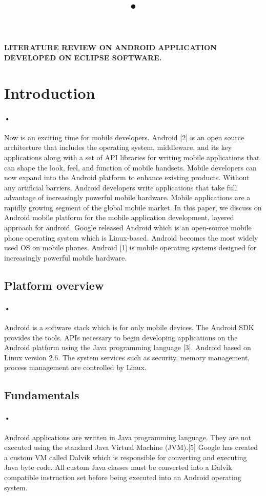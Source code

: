 \documentclass[12pt]{article}
\begin{document}
\newpage



\title{•}\textbf{LITERATURE REVIEW ON ANDROID APPLICATION DEVELOPED ON ECLIPSE SOFTWARE.}

\section{Introduction}

\paragraph{•}Now is an exciting time for mobile developers. Android [2] is an open source architecture that includes the operating system, middleware, and its key applications along with a set of API libraries for writing mobile applications that can shape the look, feel, and function of mobile handsets. Mobile developers can now expand into the Android platform to enhance existing products. Without any artificial barriers, Android developers write applications that take full advantage of increasingly powerful mobile hardware. Mobile applications are a rapidly growing segment of the global mobile market. In this paper, we discuss on Android mobile platform for the mobile application development, layered approach for android. Google released Android which is an open-source mobile phone operating system which is Linux-based. Android becomes the most widely used OS on mobile phones.  Android [1] is mobile operating systems designed for increasingly powerful mobile hardware. 


\subsection{Platform overview}
\paragraph{•}Android is a software stack which is for only mobile devices. The Android SDK provides the tools. APIs necessary to begin developing applications on the Android platform using the Java programming language [3]. Android based on Linux version 2.6. The system services such as security, memory management, process management are controlled by Linux.

\subsection{Fundamentals}
\paragraph{•}Android applications are written in Java programming language. They are not executed using the standard Java Virtual Machine (JVM).[5] Google has created a custom VM called Dalvik which is responsible for converting and executing Java byte code. All custom Java classes must be converted into a Dalvik compatible instruction set before being executed into an Android operating system.
\end{document}
